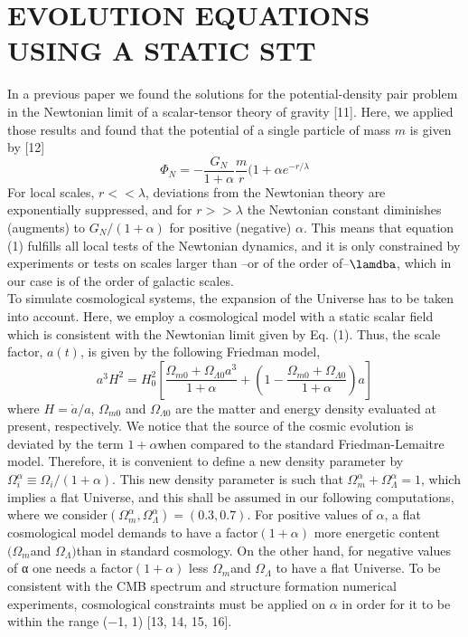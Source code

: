 \documentclass[10pt,times]{IEEEtran}
\begin{document}
\section{\textbf{EVOLUTION EQUATIONS USING A STATIC
STT}}
In a previous paper we found the solutions for the
potential-density pair problem in the Newtonian limit of
a scalar-tensor theory of gravity [11]. Here, we applied
those results and found that the potential of a single particle of mass $m$ is given by [12]
\begin{equation}
    \Phi_{N}=-\frac{G_{N}}{1+\alpha}\frac{m}{r}(1+\alpha e^{-r/\lambda}
\end{equation}
For local scales, \(r <<\lambda\),  deviations from the Newtonian theory are exponentially suppressed, and for \(r >>\lambda\) the Newtonian constant diminishes (augments) to \(G_{N}/(1+\alpha)\) for positive (negative) \(\alpha \). This means that equation
(1) fulfills all local tests of the Newtonian dynamics, and it is only constrained by experiments or tests on scales larger than –or of the order of–\(\lamdba \), which in our case is of
the order of galactic scales.\\

To simulate cosmological systems, the expansion of the
Universe has to be taken into account. Here, we employ a
cosmological model with a static scalar field which is consistent with the Newtonian limit given by Eq. (1). Thus,
the scale factor, $a(t)$, is given by the following Friedman
model,
\begin{equation}
    a^{3}H^{2}=H_{0}^{2}\left [\frac{\Omega_{m0}+\Omega_{\Lambda 0}a^{3}}{1+\alpha}+\left (1-\frac{\Omega_{m0}+\Omega_{\Lambda0}}{1+\alpha}  \right )a  \right ]
\end{equation}
where \(H=\dot{a}/{a}\), \(\Omega_{m0}\) and \(\Omega_{\Lambda 0}\) are the matter and energy density evaluated at present, respectively. We notice that the source of the cosmic evolution is deviated by the term \(1+\alpha\)when compared to the standard Friedman-Lemaitre model. Therefore, it is convenient to define a new density parameter by \(\Omega_{i}^{\alpha}\equiv \Omega_{i}/(1+\alpha)\). This new density parameter is such that \(\Omega_{m}^{\alpha}+\Omega_{\Lambda}^{\alpha}=1\), which implies a
flat Universe, and this shall be assumed in our following
computations, where we consider\((\Omega_{m}^{\alpha},\Omega_{\Lambda}^{\alpha})=(0.3,0.7)\).
For positive values of \(\alpha\), a flat cosmological model demands to have a factor\((1+\alpha)\) more energetic content \((\Omega_{m}\)and \(\Omega_{\Lambda})\)than in standard cosmology. On the other
hand, for negative values of α one needs a factor\((1+\alpha)\) less \(\Omega_{m}\)and \(\Omega_{\Lambda}\) to have a flat Universe. To be consistent with the CMB spectrum and structure formation
numerical experiments, cosmological constraints must be
applied on \(\alpha\) in order for it to be within the range (−1, 1)
[13, 14, 15, 16].\\
\end{document}
